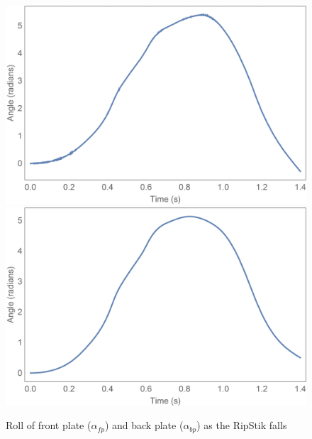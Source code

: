\begin{figure}[!htb]
	\centering
	\includegraphics[width=\linewidth]{fallalphafp}
	\endminipage\hspace{1em}%
	\includegraphics[width=\linewidth]{fallalphabp}
	\endminipage
	\caption{Roll of front plate ($\alpha_{fp}$) and back plate ($\alpha_{bp}$) as the RipStik falls}\label{fig:fallplates}
\end{figure}


